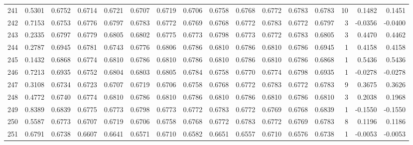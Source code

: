 \begin{tabular}{lrrrrrrrrrrrrrrr}
241 &      0.5301 &  0.6752 &  0.6714 &  0.6721 &  0.6707 &  0.6719 &  0.6706 &  0.6758 &  0.6768 &  0.6772 &   0.6783 &     0.6783 &     10 &                    0.1482 &                     0.1451 \\
242 &      0.7153 &  0.6753 &  0.6776 &  0.6797 &  0.6783 &  0.6772 &  0.6769 &  0.6768 &  0.6772 &  0.6783 &   0.6772 &     0.6797 &      3 &                   -0.0356 &                    -0.0400 \\
243 &      0.2335 &  0.6797 &  0.6779 &  0.6805 &  0.6802 &  0.6775 &  0.6773 &  0.6798 &  0.6773 &  0.6772 &   0.6783 &     0.6805 &      3 &                    0.4470 &                     0.4462 \\
244 &      0.2787 &  0.6945 &  0.6781 &  0.6743 &  0.6776 &  0.6806 &  0.6786 &  0.6810 &  0.6786 &  0.6810 &   0.6786 &     0.6945 &      1 &                    0.4158 &                     0.4158 \\
245 &      0.1432 &  0.6868 &  0.6774 &  0.6810 &  0.6786 &  0.6810 &  0.6786 &  0.6810 &  0.6786 &  0.6810 &   0.6786 &     0.6868 &      1 &                    0.5436 &                     0.5436 \\
246 &      0.7213 &  0.6935 &  0.6752 &  0.6804 &  0.6803 &  0.6805 &  0.6784 &  0.6758 &  0.6770 &  0.6774 &   0.6798 &     0.6935 &      1 &                   -0.0278 &                    -0.0278 \\
247 &      0.3108 &  0.6734 &  0.6723 &  0.6707 &  0.6719 &  0.6706 &  0.6758 &  0.6768 &  0.6772 &  0.6783 &   0.6772 &     0.6783 &      9 &                    0.3675 &                     0.3626 \\
248 &      0.4772 &  0.6740 &  0.6774 &  0.6810 &  0.6786 &  0.6810 &  0.6786 &  0.6810 &  0.6786 &  0.6810 &   0.6786 &     0.6810 &      3 &                    0.2038 &                     0.1968 \\
249 &      0.8389 &  0.6839 &  0.6775 &  0.6773 &  0.6798 &  0.6773 &  0.6772 &  0.6783 &  0.6772 &  0.6769 &   0.6768 &     0.6839 &      1 &                   -0.1550 &                    -0.1550 \\
250 &      0.5587 &  0.6773 &  0.6707 &  0.6719 &  0.6706 &  0.6758 &  0.6768 &  0.6772 &  0.6783 &  0.6772 &   0.6769 &     0.6783 &      8 &                    0.1196 &                     0.1186 \\
251 &      0.6791 &  0.6738 &  0.6607 &  0.6641 &  0.6571 &  0.6710 &  0.6582 &  0.6651 &  0.6557 &  0.6710 &   0.6576 &     0.6738 &      1 &                   -0.0053 &                    -0.0053 \\

\end{tabular}
